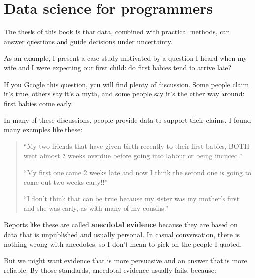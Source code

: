 \documentclass[12pt]{book}
\begin{document}
\normalsize

\clearemptydoublepage

\begin{latexonly}

\tableofcontents

\clearemptydoublepage

\end{latexonly}

\mainmatter


\chapter{Data science for programmers}
\label{intro}

The thesis of this book is that data, combined with practical
methods, can answer questions and guide decisions under uncertainty.

As an example, I present a case study motivated by a question
I heard when my wife and I were expecting our first child: do first
babies tend to arrive late?

If you Google this question, you will find plenty of discussion.  Some
people claim it's true, others say it's a myth, and some people say
it's the other way around: first babies come early.

In many of these discussions, people provide data to support their
claims.  I found many examples like these:

\begin{quote}

``My two friends that have given birth recently to their first babies,
BOTH went almost 2 weeks overdue before going into labour or being
induced.''

``My first one came 2 weeks late and now I think the second one is
going to come out two weeks early!!''

``I don't think that can be true because my sister was my mother's
first and she was early, as with many of my cousins.''

\end{quote}

Reports like these are called {\bf anecdotal evidence} because they
are based on data that is unpublished and usually personal.  In casual
conversation, there is nothing wrong with anecdotes, so I don't mean
to pick on the people I quoted.

But we might want evidence that is more persuasive and
an answer that is more reliable.  By those standards, anecdotal
evidence usually fails, because:
\end{document}
